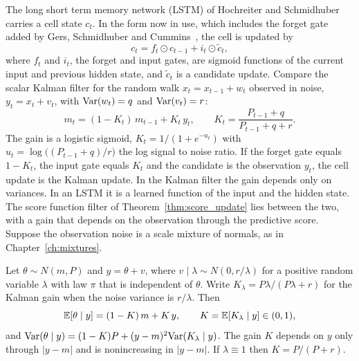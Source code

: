 The long short term memory network (LSTM) of Hochreiter and Schmidhuber~\cite{hochreiter1997} carries a cell state $c_t$. In the form now in use, which includes the forget gate added by Gers, Schmidhuber and Cummins~\cite{gers2000}, the cell is updated by
\[
c_t = f_t\odot c_{t-1}+i_t\odot\tilde c_t,
\]
where $f_t$ and $i_t$, the forget and input gates, are sigmoid functions of the current input and previous hidden state, and $\tilde c_t$ is a candidate update. Compare the scalar Kalman filter for the random walk $x_t = x_{t-1}+w_t$ observed in noise, $y_t = x_t+v_t$, with $\mathrm{Var}(w_t) = q$ and $\mathrm{Var}(v_t) = r$:
\[
m_t = (1-K_t)\,m_{t-1}+K_t\,y_t,\qquad K_t = \frac{P_{t-1}+q}{P_{t-1}+q+r}.
\]
The gain is a logistic sigmoid, $K_t = 1/(1+e^{-u_t})$ with $u_t = \log\big((P_{t-1}+q)/r\big)$ the log signal to noise ratio. If the forget gate equals $1-K_t$, the input gate equals $K_t$ and the candidate is the observation $y_t$, the cell update is the Kalman update. In the Kalman filter the gain depends only on variances. In an LSTM it is a learned function of the input and the hidden state. The score function filter of Theorem~\ref{thm:score_update} lies between the two, with a gain that depends on the observation through the predictive score. Suppose the observation noise is a scale mixture of normals, as in Chapter~\ref{ch:mixtures}.

\begin{proposition}
\label{prop:gates_bayes}
Let $\theta\sim N(m,P)$ and $y = \theta+v$, where $v\mid\lambda\sim N(0,r/\lambda)$ for a positive random variable $\lambda$ with law $\pi$ that is independent of $\theta$. Write $K_\lambda = P\lambda/(P\lambda+r)$ for the Kalman gain when the noise variance is $r/\lambda$. Then
\[
\mathbb{E}[\theta\mid y] = (1-K)\,m+K\,y,\qquad K = \mathbb{E}[K_\lambda\mid y]\in(0,1),
\]
and $\mathrm{Var}(\theta\mid y) = (1-K)P+(y-m)^2\mathrm{Var}(K_\lambda\mid y)$. The gain $K$ depends on $y$ only through $|y-m|$ and is nonincreasing in $|y-m|$. If $\lambda\equiv1$ then $K = P/(P+r)$.
\end{proposition}

